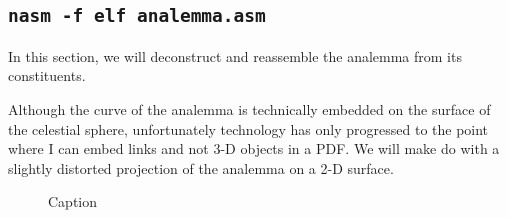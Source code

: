 \subsection{\texttt{nasm -f elf analemma.asm}}
In this section, we will deconstruct and reassemble the analemma from its constituents. 

Although the curve of the analemma is technically embedded on the surface of the celestial sphere, unfortunately technology has only progressed to the point where I can embed links and not 3-D objects in a PDF. We will make do with a slightly distorted projection of the analemma on a 2-D surface.

\begin{figure}
    \centering
    \caption{Caption}
    \label{fig:my_label}
\end{figure}

